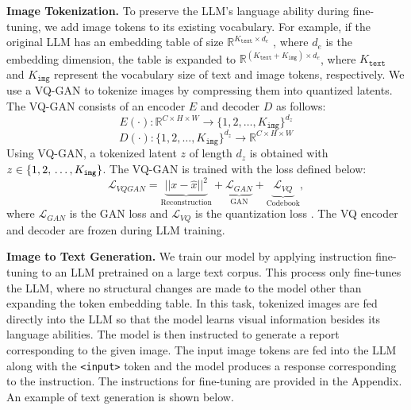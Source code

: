 \vspace{3pt}
\noindent \textbf{Image Tokenization.}
To preserve the LLM's language ability during fine-tuning, we add image tokens to its existing vocabulary. For example, if the original LLM has an embedding table of size $\mathbb{R}^{K_\texttt{text}\times d_e}$ , where $d_e$ is the embedding dimension, the table is expanded to $\mathbb{R}^{(K_\texttt{text}+K_\texttt{img})\times d_e}$, where $K_\texttt{text}$ and $K_\texttt{img}$ represent the vocabulary size of text and image tokens, respectively. We use a VQ-GAN to tokenize images by compressing them into quantized latents. The VQ-GAN consists of an encoder $E$ and decoder $D$ as follows:
\begin{equation}
    E(\cdot):\mathbb{R}^{C\times H\times W} \rightarrow \{1,2,\ldots,K_\texttt{img}\}^{d_z}
\end{equation}
\begin{equation}
    D(\cdot):\{1,2,\ldots,K_\texttt{img}\}^{d_z} \rightarrow \mathbb{R}^{C\times H\times W}
\end{equation}
Using VQ-GAN, a tokenized latent $z$ of length $d_z$ is obtained with $z \in \{1,2, \\ \ldots,K_\texttt{img}\}$. The VQ-GAN is trained with the loss defined below:
\begin{equation} 
\mathcal{L}_{VQGAN} = \underbrace{||x - \hat{x}||^2}_{\text{Reconstruction}} + \underbrace{\mathcal{L}_{GAN}}_\text{GAN} + \underbrace{\mathcal{L}_{VQ}}_\text{Codebook}, 
\end{equation}
where $\mathcal{L}_{GAN}$ is the GAN loss \cite{isola2017image} and $\mathcal{L}_{VQ}$ is the quantization loss \cite{van2017neural,esser2021taming}. The VQ encoder and decoder are frozen during LLM training.

\vspace{3pt}
\noindent \textbf{Image to Text Generation.}
We train our model by applying instruction fine-tuning to an LLM pretrained on a large text corpus. This process only fine-tunes the LLM, where no structural changes are made to the model other than expanding the token embedding table. In this task, tokenized images are fed directly into the LLM so that the model learns visual information besides its language abilities. The model is then instructed to generate a report corresponding to the given image. The input image tokens are fed into the LLM along with the \texttt{<input>} token and the model produces a response corresponding to the instruction. The instructions for fine-tuning are provided in the Appendix. An example of text generation is shown below.

